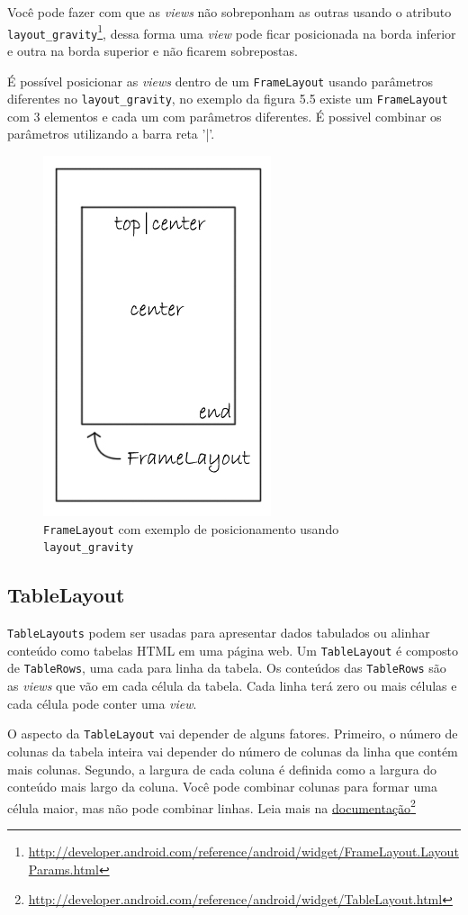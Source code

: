 \documentclass[a4paper,12pt,brazil]{book}
\begin{document}
\begin{singlespace}
Você pode fazer com que as \emph{views} não sobreponham as outras usando o atributo \texttt{layout\_gravity}\footnote{\href{http://developer.android.com/reference/android/widget/FrameLayout.LayoutParams.html}{http://developer.android.com/reference/android/widget/FrameLayout.LayoutParams.html}}, dessa forma uma \emph{view} pode ficar posicionada na borda inferior e outra na borda superior e não ficarem sobrepostas.

É possível posicionar as \emph{views} dentro de um \texttt{FrameLayout} usando parâmetros diferentes no \texttt{layout\_gravity}, no exemplo da figura 5.5 existe um \texttt{FrameLayout} com 3 elementos e cada um com parâmetros diferentes. É possivel combinar os parâmetros utilizando a barra reta '|'.

\begin{figure}[H]
  \centering
  \includegraphics[width=.25\textwidth]{figuras/design/framelayout_gravity.jpg}
  \caption{\texttt{FrameLayout} com exemplo de posicionamento usando \texttt{layout\_gravity}}
  \label{fig:e}
\end{figure}

\subsection{TableLayout}

\texttt{TableLayouts} podem ser usadas para apresentar dados tabulados ou alinhar conteúdo como tabelas HTML em uma página web. Um \texttt{TableLayout} é composto de \texttt{TableRows}, uma cada para linha da tabela. Os conteúdos das \texttt{TableRows} são as \emph{views} que vão em cada célula da tabela. Cada linha terá zero ou mais células e cada célula pode conter uma \emph{view}. 

O aspecto da \texttt{TableLayout} vai depender de alguns fatores. Primeiro, o número de colunas da tabela inteira vai depender do número de colunas da linha que contém mais colunas. Segundo, a largura de cada coluna é definida como a largura do conteúdo mais largo da coluna. Você pode combinar colunas para formar uma célula maior, mas não pode combinar linhas. Leia mais na \href{http://developer.android.com/reference/android/widget/TableLayout.html}{documentação}\footnote{\href{http://developer.android.com/reference/android/widget/TableLayout.html}{http://developer.android.com/reference/android/widget/TableLayout.html}}


\end{singlespace}
\end{document}
